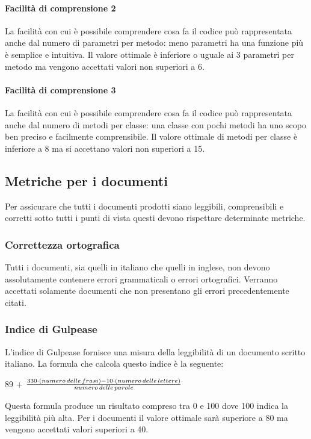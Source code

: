 			\paragraph{Facilità di comprensione 2}
			La facilità con cui è possibile comprendere cosa fa il codice può rappresentata anche dal numero di parametri per metodo: meno parametri ha una funzione più è semplice e intuitiva. Il valore ottimale è inferiore o uguale ai 3 parametri per metodo ma vengono accettati valori non superiori a 6.
			\paragraph{Facilità di comprensione 3}
			La facilità con cui è possibile comprendere cosa fa il codice può rappresentata anche dal numero di metodi per classe: una classe con pochi metodi ha uno scopo ben preciso e facilmente comprensibile. Il valore ottimale di metodi per classe è inferiore a 8 ma si accettano valori non superiori a 15. 
	\subsection{Metriche per i documenti}
	Per assicurare che tutti i documenti prodotti siano leggibili, comprensibili e corretti sotto tutti i punti di vista questi devono rispettare determinate metriche.
	\subsubsection{Correttezza ortografica}
	Tutti i documenti, sia quelli in italiano che quelli in inglese, non devono assolutamente contenere errori grammaticali o errori ortografici. Verranno accettati solamente documenti che non presentano gli errori precedentemente citati.
	\subsubsection{Indice di Gulpease}
	L'indice di Gulpease fornisce una misura della leggibilità di un documento scritto italiano. La formula che calcola questo indice è la seguente:\\
	\centerline{ 89 + \(\frac{ {330 \cdot (numero \thinspace delle \thinspace frasi) - 10 \cdot (numero \thinspace delle \thinspace lettere)}}{numero \thinspace delle \thinspace parole} \)} 
	Questa formula produce un risultato compreso tra 0 e 100 dove 100 indica la leggibilità più alta. Per i documenti il valore ottimale sarà superiore a 80 ma vengono accettati valori superiori a 40.



		

